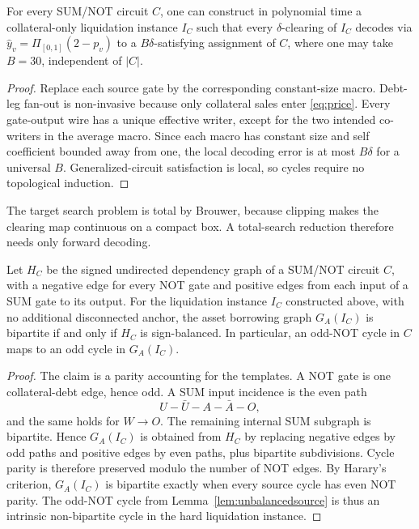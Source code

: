 \documentclass{llncs}
\newcommand{\clip}{\Pi}
\newcommand{\GA}{G_A}
\begin{document}
\begin{lemma}
\label{lem:forward}
For every SUM/NOT circuit \(C\), one can construct in polynomial time a collateral-only liquidation instance \(I_C\) such that every \(\delta\)-clearing of \(I_C\) decodes via \(\widehat y_v=\clip_{[0,1]}(2-p_v)\) to a \(B\delta\)-satisfying assignment of \(C\), where one may take \(B=30\), independent of \(|C|\).
\end{lemma}
\begin{proof}
Replace each source gate by the corresponding constant-size macro. Debt-leg fan-out is non-invasive because only collateral sales enter \eqref{eq:price}. Every gate-output wire has a unique effective writer, except for the two intended co-writers in the average macro. Since each macro has constant size and self coefficient bounded away from one, the local decoding error is at most \(B\delta\) for a universal \(B\). Generalized-circuit satisfaction is local, so cycles require no topological induction.
\end{proof}

The target search problem is total by Brouwer, because clipping makes the clearing map continuous on a compact box. A total-search reduction therefore needs only forward decoding.

\begin{lemma}
\label{lem:gadgetparity}
Let \(H_C\) be the signed undirected dependency graph of a SUM/NOT circuit \(C\), with a negative edge for every NOT gate and positive edges from each input of a SUM gate to its output. For the liquidation instance \(I_C\) constructed above, with no additional disconnected anchor, the asset borrowing graph \(\GA(I_C)\) is bipartite if and only if \(H_C\) is sign-balanced. In particular, an odd-NOT cycle in \(C\) maps to an odd cycle in \(\GA(I_C)\).
\end{lemma}
\begin{proof}
The claim is a parity accounting for the templates. A NOT gate is one collateral-debt edge, hence odd. A SUM input incidence is the even path
\[
       U-\bar U-A-\bar A-O,
\]
and the same holds for \(W\to O\). The remaining internal SUM subgraph is bipartite. Hence \(\GA(I_C)\) is obtained from \(H_C\) by replacing negative edges by odd paths and positive edges by even paths, plus bipartite subdivisions. Cycle parity is therefore preserved modulo the number of NOT edges. By Harary's criterion, \(\GA(I_C)\) is bipartite exactly when every source cycle has even NOT parity. The odd-NOT cycle from Lemma~\ref{lem:unbalancedsource} is thus an intrinsic non-bipartite cycle in the hard liquidation instance.
\end{proof}
\end{document}
